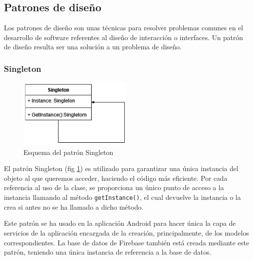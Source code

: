 \subsection{Patrones de diseño}
Los patrones de diseño son unas técnicas para resolver problemas comunes en el desarrollo de software referentes al diseño de interacción o interfaces. Un patrón de diseño resulta ser una solución a un problema de diseño.
\subsubsection{\textbf{Singleton}}
\begin{figure}[H]
    \centering
    \includegraphics[width=0.5\textwidth]{Images/Capitulo6/singleton.png}
    \caption{Esquema del patrón Singleton}
    \label{fig:singleton}
\end{figure}
El patrón Singleton (fig \ref{fig:singleton}) es utilizado para garantizar una única instancia del objeto al que queremos acceder, haciendo el código más eficiente. Por cada referencia al uso de la clase, se proporciona un único punto de acceso a la instancia llamando al método \texttt{getInstance()}, el cual devuelve la instancia o la crea si antes no se ha llamado a dicho método.

Este patrón se ha usado en la aplicación Android para hacer única la capa de servicios de la aplicación encargada de la creación, principalmente, de los modelos correspondientes.
La base de datos de Firebase también está creada mediante este patrón, teniendo una única instancia de referencia a la base de datos.

